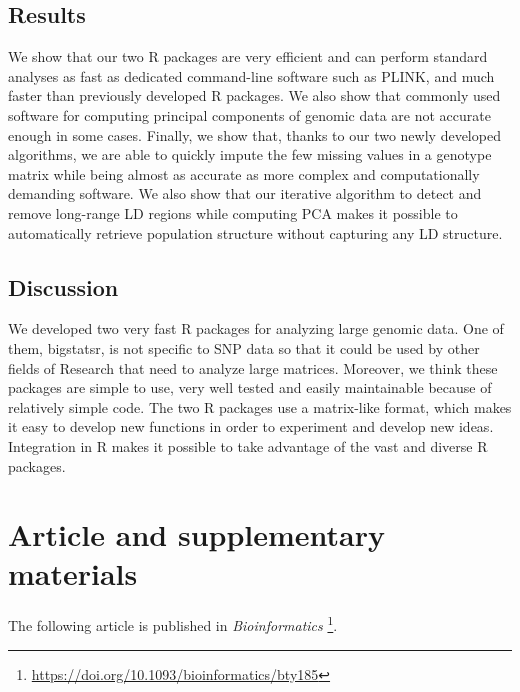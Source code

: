 \subsection{Results}

We show that our two R packages are very efficient and can perform standard analyses as fast as dedicated command-line software such as PLINK, and much faster than previously developed R packages.
We also show that commonly used software for computing principal components of genomic data are not accurate enough in some cases.
Finally, we show that, thanks to our two newly developed algorithms, we are able to quickly impute the few missing values in a genotype matrix while being almost as accurate as more complex and computationally demanding software. We also show that our iterative algorithm to detect and remove long-range LD regions while computing PCA makes it possible to automatically retrieve population structure without capturing any LD structure.

\subsection{Discussion}

We developed two very fast R packages for analyzing large genomic data. One of them, bigstatsr, is not specific to SNP data so that it could be used by other fields of Research that need to analyze large matrices.
Moreover, we think these packages are simple to use, very well tested and easily maintainable because of relatively simple code.
The two R packages use a matrix-like format, which makes it
easy to develop new functions in order to experiment and develop
new ideas. Integration in R makes it possible to take advantage of
the vast and diverse R packages.


\section{Article and supplementary materials}

The following article is published in \textit{Bioinformatics}	\footnote{\url{https://doi.org/10.1093/bioinformatics/bty185}}.




